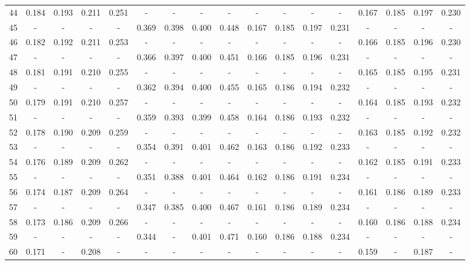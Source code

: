 \documentclass{report}
\begin{document}
\begin{table}
\begin{tabular}{|c|cccc|cccc|cccc|cccc|}
44 & 0.184 & 0.193 & 0.211 & 0.251 &   -   &   -   &   -   &   -   &   -   &   -   &   -   &   -   & 0.167 & 0.185 & 0.197 & 0.230\\
45 &   -   &   -   &   -   &   -   & 0.369 & 0.398 & 0.400 & 0.448 & 0.167 & 0.185 & 0.197 & 0.231 &   -   &   -   &   -   &   -  \\
46 & 0.182 & 0.192 & 0.211 & 0.253 &   -   &   -   &   -   &   -   &   -   &   -   &   -   &   -   & 0.166 & 0.185 & 0.196 & 0.230\\
47 &   -   &   -   &   -   &   -   & 0.366 & 0.397 & 0.400 & 0.451 & 0.166 & 0.185 & 0.196 & 0.231 &   -   &   -   &   -   &   -  \\
48 & 0.181 & 0.191 & 0.210 & 0.255 &   -   &   -   &   -   &   -   &   -   &   -   &   -   &   -   & 0.165 & 0.185 & 0.195 & 0.231\\
49 &   -   &   -   &   -   &   -   & 0.362 & 0.394 & 0.400 & 0.455 & 0.165 & 0.186 & 0.194 & 0.232 &   -   &   -   &   -   &   -  \\
50 & 0.179 & 0.191 & 0.210 & 0.257 &   -   &   -   &   -   &   -   &   -   &   -   &   -   &   -   & 0.164 & 0.185 & 0.193 & 0.232\\
51 &   -   &   -   &   -   &   -   & 0.359 & 0.393 & 0.399 & 0.458 & 0.164 & 0.186 & 0.193 & 0.232 &   -   &   -   &   -   &   -  \\
52 & 0.178 & 0.190 & 0.209 & 0.259 &   -   &   -   &   -   &   -   &   -   &   -   &   -   &   -   & 0.163 & 0.185 & 0.192 & 0.232\\
53 &   -   &   -   &   -   &   -   & 0.354 & 0.391 & 0.401 & 0.462 & 0.163 & 0.186 & 0.192 & 0.233 &   -   &   -   &   -   &   -  \\
54 & 0.176 & 0.189 & 0.209 & 0.262 &   -   &   -   &   -   &   -   &   -   &   -   &   -   &   -   & 0.162 & 0.185 & 0.191 & 0.233\\
55 &   -   &   -   &   -   &   -   & 0.351 & 0.388 & 0.401 & 0.464 & 0.162 & 0.186 & 0.191 & 0.234 &   -   &   -   &   -   &   -  \\
56 & 0.174 & 0.187 & 0.209 & 0.264 &   -   &   -   &   -   &   -   &   -   &   -   &   -   &   -   & 0.161 & 0.186 & 0.189 & 0.233\\
57 &   -   &   -   &   -   &   -   & 0.347 & 0.385 & 0.400 & 0.467 & 0.161 & 0.186 & 0.189 & 0.234 &   -   &   -   &   -   &   -  \\
58 & 0.173 & 0.186 & 0.209 & 0.266 &   -   &   -   &   -   &   -   &   -   &   -   &   -   &   -   & 0.160 & 0.186 & 0.188 & 0.234\\
59 &   -   &   -   &   -   &   -   & 0.344 &   -   & 0.401 & 0.471 & 0.160 & 0.186 & 0.188 & 0.234 &   -   &   -   &   -   &   -  \\
60 & 0.171 &   -   & 0.208 &   -   &   -   &   -   &   -   &   -   &   -   &   -   &   -   &   -   & 0.159 &   -   & 0.187 &   -  \\
\hline
\end{tabular}
\end{table}
\end{document}

